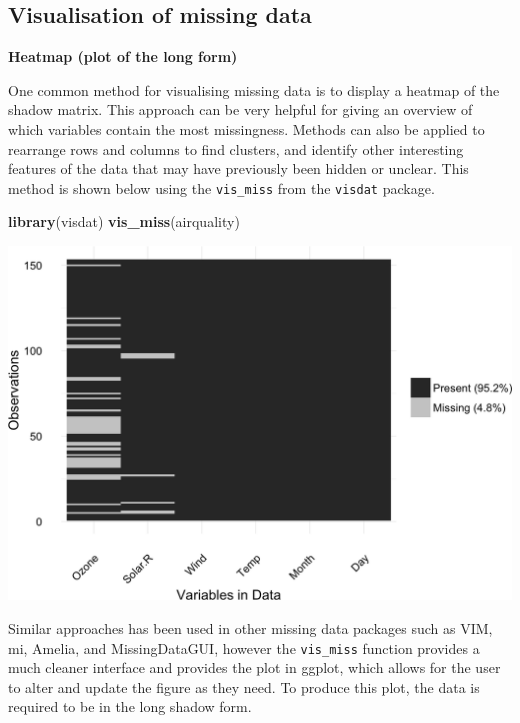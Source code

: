 \documentclass[]{article}
\newenvironment{Shaded}{\begin{snugshade}}{\end{snugshade}}
\newcommand{\KeywordTok}[1]{\textcolor[rgb]{0.13,0.29,0.53}{\textbf{{#1}}}}
\newcommand{\NormalTok}[1]{{#1}}
\begin{document}
\subsection{Visualisation of missing
data}\label{visualisation-of-missing-data}

\textbf{Heatmap (plot of the long form)}

One common method for visualising missing data is to display a heatmap
of the shadow matrix. This approach can be very helpful for giving an
overview of which variables contain the most missingness. Methods can
also be applied to rearrange rows and columns to find clusters, and
identify other interesting features of the data that may have previously
been hidden or unclear. This method is shown below using the
\texttt{vis\_miss} from the \texttt{visdat} package.

\begin{Shaded}
\begin{Highlighting}[]
\KeywordTok{library}\NormalTok{(visdat)}
\KeywordTok{vis_miss}\NormalTok{(airquality)}
\end{Highlighting}
\end{Shaded}

\includegraphics{jsm2017_files/figure-latex/unnamed-chunk-1-1.png}

Similar approaches has been used in other missing data packages such as
VIM, mi, Amelia, and MissingDataGUI, however the \texttt{vis\_miss}
function provides a much cleaner interface and provides the plot in
ggplot, which allows for the user to alter and update the figure as they
need. To produce this plot, the data is required to be in the long
shadow form.
\end{document}
